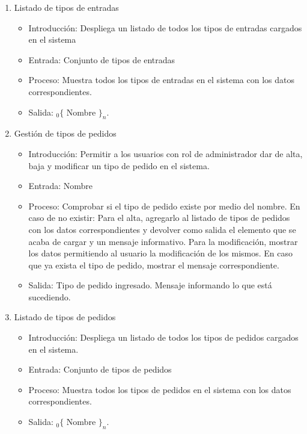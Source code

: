\begin{enumerate}
			\item Listado de tipos de entradas
				\begin{itemize}
					\item Introducción: Despliega un listado de todos los tipos de entradas cargados en el sistema
					\item Entrada: Conjunto de tipos de entradas 
					\item Proceso: Muestra todos los tipos de entradas en el sistema con los datos correspondientes.
					\item Salida: ${}_{0}\{$ Nombre $\}_n$.
				\end{itemize}
				
			\item  Gestión de tipos de pedidos
				\begin{itemize}
					\item Introducción: Permitir a los usuarios con rol de administrador dar de alta, baja y modificar un tipo de pedido en el sistema.
					\item Entrada: Nombre
					\item Proceso: Comprobar si el tipo de pedido existe por medio del nombre. En caso de no existir: 
					Para el alta, agregarlo al listado de tipos de pedidos con los datos correspondientes y devolver como salida el elemento que se acaba de cargar y un mensaje informativo.
					Para la modificación, mostrar los datos permitiendo al usuario la modificación de los mismos.
					En caso que ya exista el tipo de pedido, mostrar el mensaje correspondiente.
					\item Salida: Tipo de pedido ingresado. Mensaje informando lo que está sucediendo.
				\end{itemize}

			\item Listado de tipos de pedidos
				\begin{itemize}
					\item Introducción: Despliega un listado de todos los tipos de pedidos cargados en el sistema.
					\item Entrada: Conjunto de tipos de pedidos
					\item Proceso: Muestra todos los tipos de pedidos en el sistema con los datos correspondientes.
					\item Salida: ${}_{0}\{$ Nombre $\}_n$.
				\end{itemize}
				

\end{enumerate}
